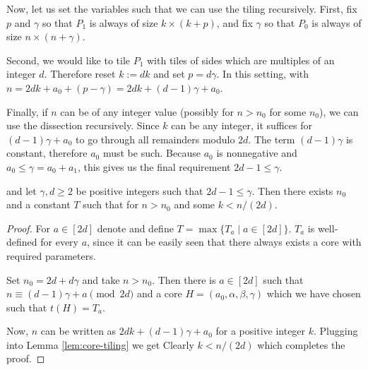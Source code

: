 Now, let us set the variables such that we can use the tiling recursively. First, fix $p$ and $\gamma$ so that $P_1$ is always of size $k \times (k+p)$, and fix $\gamma$ so that $P_0$ is always of size $n \times (n+\gamma)$.

Second, we would like to tile $P_1$ with tiles of sides which are multiples of an integer $d$. Therefore reset $k := dk$ and set $p = d\gamma$. In this setting,
with $n = 2dk + a_0 + (p-\gamma) = 2dk + (d-1)\gamma + a_0$.

Finally, if $n$ can be of any integer value (possibly for $n > n_0$ for some $n_0$), we can use the dissection recursively. Since $k$ can be any integer, it suffices for $(d-1)\gamma + a_0$ to go through all remainders modulo $2d$. The term $(d-1)\gamma$ is constant, therefore $a_0$ must be such. Because $a_0$ is nonnegative and $a_0 \leq \gamma = a_0 + a_1$, this gives us the final requirement $2d-1 \leq \gamma$.

\begin{lem}
\label{lem:t-gamma-n}

and let $\gamma, d \geq 2$ be positive integers such that $2d-1 \leq \gamma$. Then there exists $n_0$ and a constant $T$ such that
for $n > n_0$ and some $k < n/(2d)$.
\end{lem}
\begin{proof}
For $a \in [2d]$ denote
and define $T = \max \{T_a \mid a \in [2d]\}$. $T_a$ is well-defined for every $a$, since it can be easily seen that there always exists a core with required parameters.

Set $n_0 = 2d+d\gamma$ and take $n > n_0$. Then there is $a \in [2d]$ such that $n \equiv (d-1)\gamma + a \pmod{2d}$ and a core $H=(a_0,\alpha,\beta,\gamma)$ which we have chosen such that $t(H) = T_a$.

Now, $n$ can be written as $2dk + (d-1)\gamma + a_0$ for a positive integer $k$. Plugging into Lemma \ref{lem:core-tiling} we get
Clearly $k < n/(2d)$ which completes the proof.
\end{proof}

